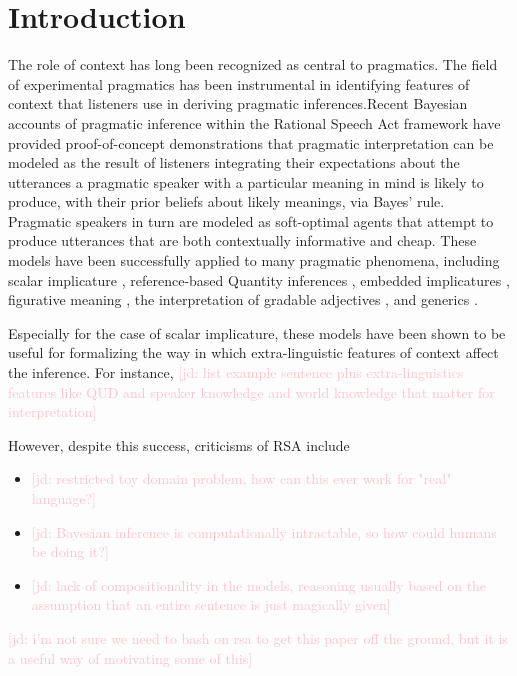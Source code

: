 \documentclass[10pt,letterpaper]{article}
\newcommand{\jd}[1]{\textcolor{Pink}{[jd: #1]}}
\begin{document}
\section{Introduction}

The role of context has long been recognized as central to pragmatics. The field of experimental pragmatics has been instrumental in identifying features of context that listeners use in deriving pragmatic inferences.Recent Bayesian accounts of pragmatic inference within the Rational Speech Act framework \cite{Frank2012, Goodman2016, Franke2016} have provided proof-of-concept demonstrations that pragmatic interpretation can be modeled as the result of listeners integrating their expectations about the utterances a pragmatic speaker with a particular meaning in mind is likely to produce, with their prior beliefs about likely meanings, via Bayes' rule. Pragmatic speakers in turn are modeled as soft-optimal agents that attempt to produce utterances that are both contextually informative and cheap. These models have been successfully applied to many pragmatic phenomena, including scalar implicature \cite{Goodman2013, Degen2015}, reference-based Quantity inferences \cite{Frank2012, Qing2015, Stiller2015, FrankeDegen2015}, embedded implicatures \cite{bergen2016}, figurative meaning \cite{kao2014}, the interpretation of gradable adjectives \cite{lassiter2013}, and generics \cite{tessler2019}.

Especially for the case of scalar implicature, these models have been shown to be useful for formalizing the way in which extra-linguistic features of context affect the inference. For instance,  \jd{list example sentence plus extra-linguistics features like QUD and speaker knowledge and world knowledge that matter for interpretation}

However, despite this success, criticisms of RSA include
\begin{itemize}
	\item \jd{restricted toy domain problem, how can this ever work for "real" language?}
	\item \jd{Bayesian inference is computationally intractable, so how could humans  be doing it?}
	\item \jd{lack of compositionality in the models, reasoning usually based on the assumption that an entire sentence is just magically given}
\end{itemize}

\jd{i'm not sure we need to bash on rsa to get this paper off the ground, but it is a useful way of motivating some of this}
\end{document}
